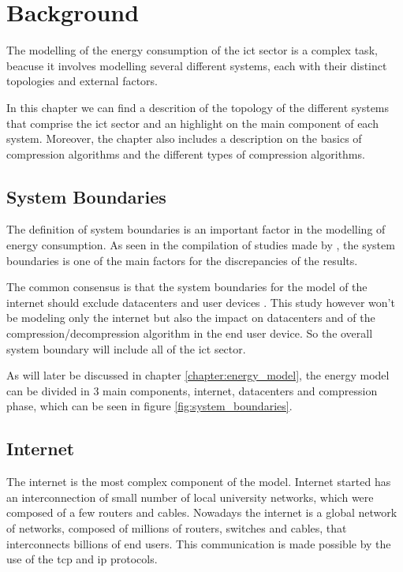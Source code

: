 

\chapter{Background}
\label{chapter:background}

\begin{introduction}
    
    The modelling of the energy consumption of the \ac{ict} sector is a complex task, beacuse it involves modelling several different systems, each with their distinct topologies and external factors.

    In this chapter we can find a descrition of the topology of the different systems that comprise the \ac{ict} sector and an highlight on the main component of each system. Moreover, the chapter also includes a description on the basics of compression algorithms and the different types of compression algorithms.

\end{introduction}

\section{System Boundaries}

The definition of system boundaries is an important factor in the modelling of energy consumption. As seen in the compilation of studies made by \citet{Aslan2018}, the system boundaries is one of the main factors for the discrepancies of the results.

The common consensus is that the system boundaries for the model of the internet should exclude datacenters and user devices \citet{Coroama2014}. This study however won't be modeling only the internet but also the impact on datacenters and of the compression/decompression algorithm in the end user device. So the overall system boundary will include all of the \ac{ict} sector. 

As will later be discussed in chapter \ref{chapter:energy_model}, the energy model can be divided in 3 main components, internet, datacenters and compression phase, which can be seen in figure \ref{fig:system_boundaries}.

\section{Internet}

The internet is the most complex component of the model.
Internet started has an interconnection of small number of local university networks, which were composed of a few routers and cables. Nowadays the internet is a global network of networks, composed of millions of routers, switches and cables, that interconnects billions of end users. This communication is made possible by the use of the \ac{tcp} and \ac{ip} protocols.

